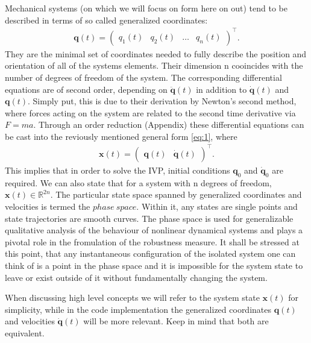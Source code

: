     Mechanical systems (on which we will focus on form here on out) tend to be described in terms of so called generalized coordinates: \begin{gather}\mathbf{q}(t)=\begin{pmatrix}q_1(t)&q_2(t)&\ldots&q_n(t) \end{pmatrix}^\intercal . \end{gather} They are the minimal set of coordinates needed to fully describe the position and orientation of all of the systems elements. Their dimension n cooincides with the number of degrees of freedom of the system. The corresponding differential equations are of second order, depending on $\ddot{\mathbf{q}}(t)$ in addition to $\dot{\mathbf{q}}(t)$ and $\mathbf{q}(t)$. Simply put, this is due to their derivation by Newton's second method, where forces acting on the system are related to the second time derivative via $F = ma$.
    Through an order reduction (Appendix) these differential equations can be cast into the reviously mentioned general form \ref{eq:1}, where \begin{gather*} \mathbf{x}(t) = \begin{pmatrix}\mathbf{q}(t)&\dot{\mathbf{q}}(t)\end{pmatrix}^\intercal .\end{gather*}
    This implies that in order to solve the IVP, initial conditions $\mathbf{q}_0$ and $\dot{\mathbf{q}}_0$ are required. We can also state that for a system with n degrees of freedom, $\mathbf{x}(t) \in \mathbb{R}^{2n}$. The particular state space spanned by generalized coordinates and velocities is termed the $phase\ space$. Within it, any states are single points and state trajectories are smooth curves. The phase space is used for generalizable qualitative analysis of the behaviour of nonlinear dynamical systems and plays a pivotal role in the fromulation of the robustness measure. It shall be stressed at this point, that any instantaneous configuration of the isolated system one can think of is a point in the phase space and it is impossible for the system state to leave or exist outside of it without fundamentally changing the system. 

    When discussing high level concepts we will refer to the system state $\mathbf{x}(t)$ for simplicity, while in the code implementation the generalized coordinates $\mathbf{q}(t)$ and velocities $\dot{\mathbf{q}}(t)$ will be more relevant. Keep in mind that both are equivalent.




